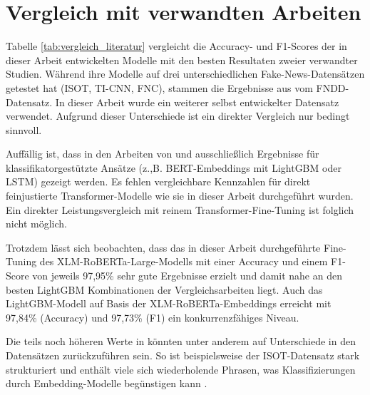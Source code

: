 \section{Vergleich mit verwandten Arbeiten}

Tabelle \ref{tab:vergleich_literatur} vergleicht die Accuracy- und F1-Scores der in dieser Arbeit entwickelten Modelle mit den besten Resultaten zweier 
verwandter Studien. Während \cite{Essa:2023aa} ihre Modelle auf drei unterschiedlichen Fake-News-Datensätzen getestet hat 
(ISOT, TI-CNN, FNC), stammen die Ergebnisse aus \cite{V_G_2024} vom FNDD-Datensatz. In dieser Arbeit wurde ein weiterer selbst entwickelter Datensatz verwendet. 
Aufgrund dieser Unterschiede ist ein direkter Vergleich nur bedingt sinnvoll.

Auffällig ist, dass in den Arbeiten von \cite{Essa:2023aa} und \cite{V_G_2024} ausschließlich Ergebnisse für klassifikatorgestützte Ansätze 
(z.,B. BERT-Embeddings mit LightGBM oder LSTM) gezeigt werden. Es fehlen vergleichbare Kennzahlen für direkt feinjustierte Transformer-Modelle 
wie sie in dieser Arbeit durchgeführt wurden. Ein direkter Leistungsvergleich mit reinem Transformer-Fine-Tuning ist folglich nicht möglich.

Trotzdem lässt sich beobachten, dass das in dieser Arbeit durchgeführte Fine-Tuning des XLM-RoBERTa-Large-Modells mit einer Accuracy und einem F1-Score von 
jeweils 97,95\% sehr gute Ergebnisse erzielt und damit nahe an den besten LightGBM Kombinationen der Vergleichsarbeiten liegt. 
Auch das LightGBM-Modell auf Basis der XLM-RoBERTa-Embeddings erreicht mit 97,84\% (Accuracy) und 97,73\% (F1) ein konkurrenzfähiges Niveau.

Die teils noch höheren Werte in \cite{Essa:2023aa} könnten unter anderem auf Unterschiede in den Datensätzen zurückzuführen sein. 
So ist beispielsweise der ISOT-Datensatz stark strukturiert und enthält viele sich wiederholende Phrasen, was Klassifizierungen durch Embedding-Modelle begünstigen kann \cite{s22186970}. 

